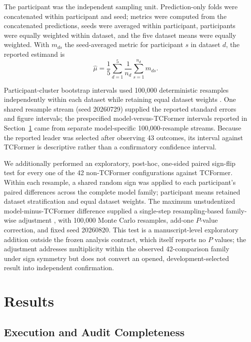 \documentclass[journal,twoside,web]{template/ieeecolor2-tectonic}
\begin{document}
The participant was the independent sampling unit. Prediction-only folds were concatenated within participant and seed; metrics were computed from the concatenated predictions, seeds were averaged within participant, participants were equally weighted within dataset, and the five dataset means were equally weighted. With $m_{ds}$ the seed-averaged metric for participant $s$ in dataset $d$, the reported estimand is
\begin{equation}
\widehat\mu=\frac{1}{5}\sum_{d=1}^{5}\frac{1}{n_d}\sum_{s=1}^{n_d}m_{ds}.
\label{eq:estimand}
\end{equation}

Participant-cluster bootstrap intervals used 100,000 deterministic resamples independently within each dataset while retaining equal dataset weights \cite{Efron1979}. One shared resample stream (seed 20260729) supplied the reported standard errors and figure intervals; the prespecified model-versus-TCFormer intervals reported in Section~\ref{sec:results} came from separate model-specific 100,000-resample streams. Because the reported leader was selected after observing 43 outcomes, its interval against TCFormer is descriptive rather than a confirmatory confidence interval.

We additionally performed an exploratory, post-hoc, one-sided paired sign-flip test for every one of the 42 non-TCFormer configurations against TCFormer. Within each resample, a shared random sign was applied to each participant's paired differences across the complete model family; participant means retained dataset stratification and equal dataset weights. The maximum unstudentized model-minus-TCFormer difference supplied a single-step resampling-based family-wise adjustment \cite{WestfallYoung1993}, with 100,000 Monte Carlo resamples, add-one $P$-value correction, and fixed seed 20260820. This test is a manuscript-level exploratory addition outside the frozen analysis contract, which itself reports no $P$ values; the adjustment addresses multiplicity within the observed 42-comparison family under sign symmetry but does not convert an opened, development-selected result into independent confirmation.

\section{Results}
\label{sec:results}

\subsection{Execution and Audit Completeness}
\end{document}

